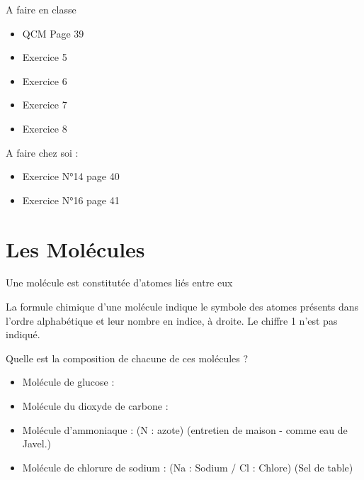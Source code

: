 \documentclass[a4paper,12pt]{article}
\begin{document}
\begin{tcolorbox}[colback=blue!10!white, colframe=blue!75!black, title=Exemples - Application]
  A faire en classe 
  \begin{itemize}[noitemsep]
    \item QCM Page 39
    \item Exercice 5
    \item Exercice 6
    \item Exercice 7
    \item Exercice 8
  \end{itemize}

  A faire chez soi :
  \begin{itemize}[noitemsep]
    \item Exercice N°14 page 40
    \item Exercice N°16 page 41
  \end{itemize}
\end{tcolorbox}


\section{Les Molécules}

\begin{tcolorbox}[colback=green!10!white, colframe=green!75!black, title=Définition : Molécule]
    Une molécule est constitutée d'atomes liés entre eux
\end{tcolorbox}

La formule chimique d'une molécule indique le symbole des atomes présents dans l'ordre alphabétique et leur nombre en indice, à droite. Le chiffre 1 n'est pas indiqué.


\begin{tcolorbox}[colback=blue!10!white, colframe=blue!75!black, title=Exemples - Application]
  Quelle est la composition de chacune de ces molécules ?
  \begin{itemize}[noitemsep]
    \item Molécule de glucose :  
    \item Molécule du dioxyde de carbone : 
    \item Molécule d'ammoniaque :  (N : azote) (entretien de maison - comme eau de Javel.)
    \item Molécule de chlorure de sodium :  (Na  : Sodium / Cl : Chlore) (Sel de table)
  \end{itemize}
\end{tcolorbox}
\end{document}

